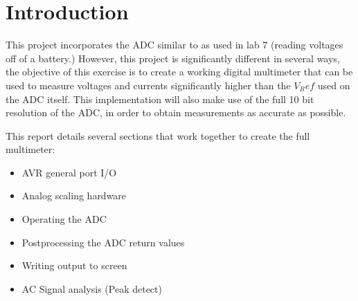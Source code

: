 \section{Introduction}



This project incorporates the ADC similar to as used in lab 7 (reading voltages off of a battery.) However, this project is significantly different in several ways, the objective of this exercise is to create a working digital multimeter that can be used to measure voltages and currents significantly higher than the $V_Ref$ used on the ADC itself. This implementation will also make use of the full 10 bit resolution of the ADC, in order to obtain measurements as accurate as possible.

This report details several sections that work together to create the full multimeter:



\begin{itemize}
\item AVR general port I/O
\item Analog scaling hardware
\item Operating the ADC
\item Postprocessing the ADC return values
\item Writing output to screen
\item AC Signal analysis (Peak detect)
\end{itemize}
